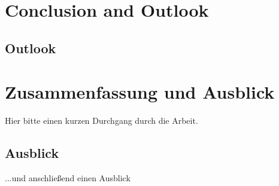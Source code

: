\ifenglish
    \chapter{Conclusion and Outlook}
    \label{chap:zusfas}

        \section*{Outlook}
\fi
\ifdeutsch
    \chapter{Zusammenfassung und Ausblick}
    \label{chap:zusfas}
    Hier bitte einen kurzen Durchgang durch die Arbeit.

        \section*{Ausblick}
        ...und anschließend einen Ausblick
\fi